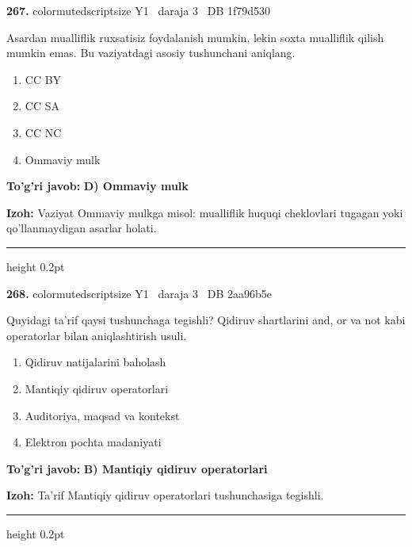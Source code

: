 \documentclass[10pt,a4paper,oneside]{article}
\begin{document}
\noindent\textbf{\color{ink}267.}  {color{muted}scriptsize Y1 \textbullet\ daraja 3 \textbullet\ DB 1f79d530}
\par
Asardan mualliflik ruxsatisiz foydalanish mumkin, lekin soxta mualliflik qilish mumkin emas. Bu vaziyatdagi asosiy tushunchani aniqlang.
\begin{enumerate}[label=\Alph*),leftmargin=9mm]
\item CC BY
\item CC SA
\item CC NC
\item Ommaviy mulk
\end{enumerate}
\begin{tcolorbox}[enhanced,breakable,colback=teal!4,colframe=teal!50!black,boxrule=0.5pt,arc=1.1mm,left=3mm,right=3mm,top=1.7mm,bottom=1.7mm,before skip=2mm,after skip=2mm]
\textbf{\color{teal}To'g'ri javob:} \textbf{D) Ommaviy mulk}
\par\smallskip
\textbf{Izoh:} Vaziyat Ommaviy mulkga misol: mualliflik huquqi cheklovlari tugagan yoki qo'llanmaydigan asarlar holati.
\end{tcolorbox}
\vspace{2mm}\hrule height 0.2pt \vspace{3mm}

\noindent\textbf{\color{ink}268.}  {color{muted}scriptsize Y1 \textbullet\ daraja 3 \textbullet\ DB 2aa96b5e}
\par
Quyidagi ta'rif qaysi tushunchaga tegishli? Qidiruv shartlarini and, or va not kabi operatorlar bilan aniqlashtirish usuli.
\begin{enumerate}[label=\Alph*),leftmargin=9mm]
\item Qidiruv natijalarini baholash
\item Mantiqiy qidiruv operatorlari
\item Auditoriya, maqsad va kontekst
\item Elektron pochta madaniyati
\end{enumerate}
\begin{tcolorbox}[enhanced,breakable,colback=teal!4,colframe=teal!50!black,boxrule=0.5pt,arc=1.1mm,left=3mm,right=3mm,top=1.7mm,bottom=1.7mm,before skip=2mm,after skip=2mm]
\textbf{\color{teal}To'g'ri javob:} \textbf{B) Mantiqiy qidiruv operatorlari}
\par\smallskip
\textbf{Izoh:} Ta'rif Mantiqiy qidiruv operatorlari tushunchasiga tegishli.
\end{tcolorbox}
\vspace{2mm}\hrule height 0.2pt \vspace{3mm}
\end{document}
